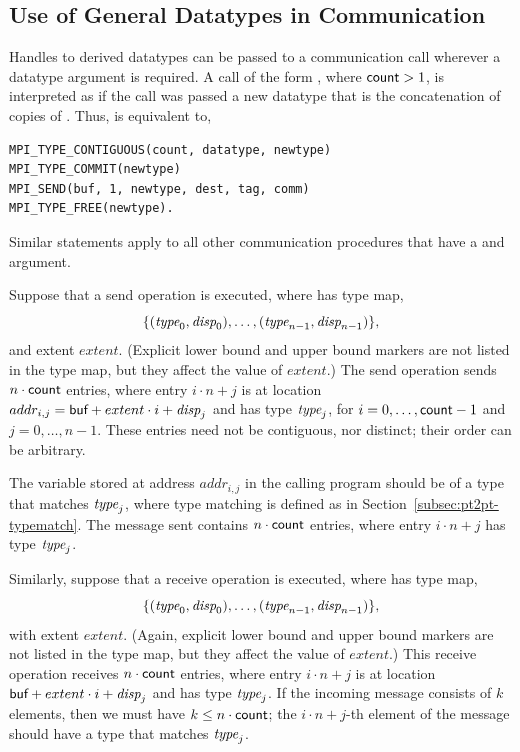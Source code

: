 \subsection{Use of General Datatypes in Communication}
\label{subsec:pt2pt-datatypeuse}

Handles to derived datatypes can be passed to a communication call wherever a
datatype argument is required.
A call of the form , where
$\textsf{count} > 1$, is interpreted as if the call was passed a new datatype
that is the
concatenation of  copies of .
Thus,
 is equivalent to,
\begin{lstlisting}[language={[MPI]Fortran}]
MPI_TYPE_CONTIGUOUS(count, datatype, newtype)
MPI_TYPE_COMMIT(newtype)
MPI_SEND(buf, 1, newtype, dest, tag, comm)
MPI_TYPE_FREE(newtype).
\end{lstlisting}
Similar statements apply to all other communication procedures that have a
 and  argument.

Suppose that a send operation  is executed, where
 has type map,
\[
\{(\textrm{\itshape{type}}_0, \textrm{\itshape{disp}}_0),\ldots,(\textrm{\itshape{type}}_{n-1}, \textrm{\itshape{disp}}_{n-1})\},
\]
and extent $extent$.  (Explicit lower bound and upper bound markers are not listed in the type map, but
they affect the value of $extent$.)
The send
operation sends $n \cdot \textsf{count}$ entries, where entry $i
\cdot n + j$ is at location
$addr_{i,j} = \textsf{buf} + extent \cdot i + \textrm{\itshape{disp}}_j$
and has type $\textrm{\itshape{type}}_j$,
for $i = 0 ,\ldots, \textsf{count}-1$ and $j = 0 ,\ldots, n-1$.
These entries need not be contiguous, nor distinct; their order can be
arbitrary.

The variable stored at address $addr_{i,j}$ in the calling program
should be of a type that matches $\textrm{\itshape{type}}_j$, where
type matching is defined as in Section~\ref{subsec:pt2pt-typematch}.
The message sent contains $n \cdot \textsf{count}$ entries, where entry
$i \cdot n +j$ has type $\textrm{\itshape{type}}_j$.

Similarly, suppose that a receive operation
 is
executed, where  has type map,
\begin{displaymath}
\{(\textrm{\itshape{type}}_0, \textrm{\itshape{disp}}_0) ,\ldots,(\textrm{\itshape{type}}_{n-1}, \textrm{\itshape{disp}}_{n-1}) \},
\end{displaymath}
\noindent
with extent $extent$.  (Again,  explicit lower bound and upper bound markers are not listed in the type map, but
they affect the value of $extent$.)
This receive operation receives
$n \cdot \textsf{count}$ entries, where entry $i \cdot n + j$ is at location
$\textsf{buf} + extent \cdot i + \textrm{\itshape{disp}}_j$
and has type $\textrm{\itshape{type}}_j$.  If the incoming message consists of $k$
elements, then we must have $k \le n \cdot \textsf{count}$; the $i \cdot n +
j$-th element of the message should have a type that matches $\textrm{\itshape{type}}_j$.

